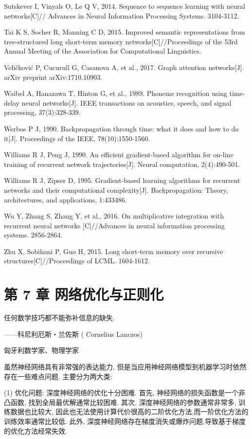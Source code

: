 \documentclass[10pt]{article}
\begin{document}
Sutskever I, Vinyals O, Le Q V, 2014. Sequence to sequence learning with neural networks[C]// Advances in Neural Information Processing Systems. 3104-3112.

Tai K S, Socher R, Manning C D, 2015. Improved semantic representations from tree-structured long short-term memory networks[C]//Proceedings of the 53rd Annual Meeting of the Association for Computational Linguistics.

Veličković P, Cucurull G, Casanova A, et al., 2017. Graph attention networks[J]. arXiv preprint arXiv:1710.10903.

Waibel A, Hanazawa T, Hinton G, et al., 1989. Phoneme recognition using time-delay neural networks[J]. IEEE transactions on acoustics, speech, and signal processing, 37(3):328-339.

Werbos P J, 1990. Backpropagation through time: what it does and how to do it[J]. Proceedings of the IEEE, 78(10):1550-1560.

Williams R J, Peng J, 1990. An efficient gradient-based algorithm for on-line training of recurrent network trajectories[J]. Neural computation, 2(4):490-501.

Williams R J, Zipser D, 1995. Gradient-based learning algorithms for recurrent networks and their computational complexity[J]. Backpropagation: Theory, architectures, and applications, 1:433486.

Wu Y, Zhang S, Zhang Y, et al., 2016. On multiplicative integration with recurrent neural networks [C]//Advances in neural information processing systems. 2856-2864.

Zhu X, Sobihani P, Guo H, 2015. Long short-term memory over recursive structures[C]//Proceedings of LCML. 1604-1612.

\section*{第 7 章 网络优化与正则化}
任何数学技巧都不能弥补信息的缺失.

——科尼利厄斯・兰佐斯 ( Cornelius Lanczos)

匈牙利数学家、物理学家

虽然神经网络具有非常强的表达能力, 但是当应用神经网络模型到机器学习时依然存在一些难点问题. 主要分为两大类:

(1) 优化问题: 深度神经网络的优化十分困难. 首先, 神经网络的损失函数是一个非凸函数, 找到全局最优解通常比较困难. 其次, 深度神经网络的参数通常非常多, 训练数据也比较大, 因此也无法使用计算代价很高的二阶优化方法,而一阶优化方法的训练效率通常比较低. 此外, 深度神经网络存在梯度消失或爆炸问题,导致基于梯度的优化方法经常失效.
\end{document}
